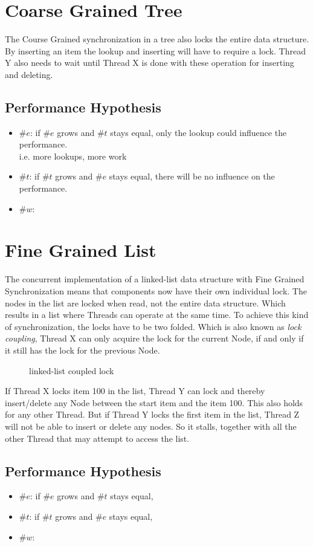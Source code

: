 \documentclass[10pt,a4paper]{article}
\begin{document}
\section{Coarse Grained Tree}
The Course Grained synchronization in a tree also locks the entire
data structure. By inserting an item the lookup and inserting will have to
require a lock. Thread Y also needs to wait until
Thread X is done with these operation for inserting and deleting.

\subsection{Performance Hypothesis}
\begin{itemize}
 \item $\#e$:   if $\#e$ grows and $\#t$ stays equal, only the lookup could influence the
 performance. \\ i.e. more lookups, more work
 \item $\#t$:   if $\#t$ grows and $\#e$ stays equal, there will be no influence on the performance.
 \item $\#w$:   
\end{itemize}

\section{Fine Grained List}
The concurrent implementation of a linked-list data structure with Fine Grained
Synchronization means that components now have their own individual lock. The
nodes in the list are locked when read, not the entire data structure. Which
results in a list where Threads can operate at the same time. To achieve this
kind of synchronization, the locks have to be two folded. Which is also known 
as \emph{lock coupling}, Thread X can only acquire the lock for the current 
Node, if and only if it still has the lock for the previous Node.
\begin{figure}[h]
\centerline{
}
\caption{linked-list coupled lock}
\end{figure}
If Thread X locks item 100 in the list, Thread Y can lock and thereby
insert/delete any Node between the start item and the item 100. This
also holds for any other Thread. But if Thread Y locks the first item in the
list, Thread Z will not be able to insert or delete any nodes. So it stalls,
together with all the other Thread that may attempt to access the list.

\subsection{Performance Hypothesis}
\begin{itemize}
 \item $\#e$:  if $\#e$ grows and $\#t$ stays equal, 
 \item $\#t$:  if $\#t$ grows and $\#e$ stays equal, 
 \item $\#w$:  
\end{itemize}
\end{document}
